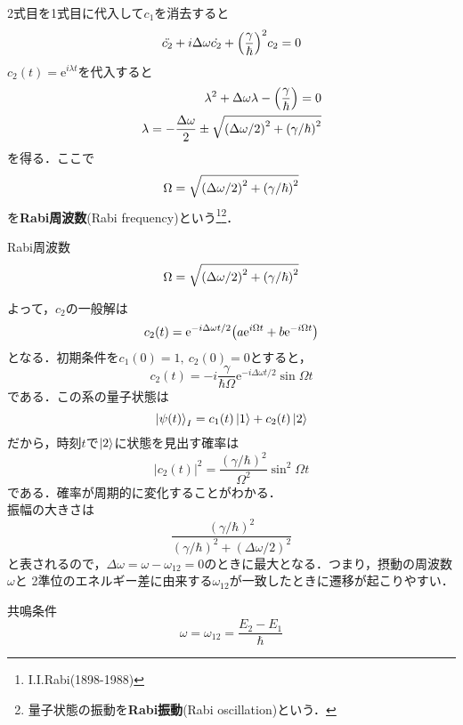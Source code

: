 \documentclass{report}
\begin{document}
  2式目を1式目に代入して$c_1$を消去すると
  \begin{equation}
    \ddot{c_2}+i\Delta\omega\dot{c_2}+\qty(\frac{\gamma}{\hbar})^2c_2=0
  \end{equation}
  $c_2(t)=\mathrm{e}^{i\lambda t}$を代入すると
  \begin{align}
    \lambda^2+\Delta\omega\lambda-\qty(\frac{\gamma}{\hbar})=0\\
    \lambda=-\frac{\Delta\omega}{2}\pm\sqrt{\qty(\Delta\omega/2)^2+\qty(\gamma/\hbar)^2}
  \end{align}
  を得る．ここで
  \begin{equation}
    \Omega=\sqrt{\qty(\Delta\omega/2)^2+\qty(\gamma/\hbar)^2}
  \end{equation}
  を\textbf{Rabi周波数}(Rabi frequency)という\footnote{I.I.Rabi(1898-1988)}\footnote{量子状態の振動を\textbf{Rabi振動}(Rabi oscillation)という．}．
  \begin{itembox}[l]{Rabi周波数}
    \begin{equation}
    \Omega=\sqrt{\qty(\Delta\omega/2)^2+\qty(\gamma/\hbar)^2}   
    \end{equation}
  \end{itembox}
  よって，$c_2$の一般解は
  \begin{equation}
    c_2(t)=\mathrm{e}^{-i\Delta\omega t/2}\qty(a\mathrm{e}^{i\Omega t}+b\mathrm{e}^{-i\Omega t})
  \end{equation}
  となる．初期条件を$c_1(0)=1,\ c_2(0)=0$とすると，
  \begin{equation}
    c_2(t)=-i\frac{\gamma}{\hbar\Omega}\mathrm{e}^{-i\Delta\omega t/2}\sin\Omega t
  \end{equation}
  である．この系の量子状態は
  \begin{equation}
    \ket{\psi(t)}_I=c_1(t)\ket{1}+c_2(t)\ket{2}
  \end{equation}
  だから，時刻$t$で$\ket{2}$に状態を見出す確率は
  \begin{equation}
    |c_2(t)|^2=\frac{(\gamma/\hbar)^2}{\Omega^2}\sin^2\Omega t
  \end{equation}
  である．確率が周期的に変化することがわかる．\\
  振幅の大きさは
  \begin{equation}
    \frac{(\gamma/\hbar)^2}{(\gamma/\hbar)^2+(\Delta\omega/2)^2}
  \end{equation}
  と表されるので，$\Delta\omega=\omega-\omega_{12}=0$のときに最大となる．つまり，摂動の周波数$\omega$と
  2準位のエネルギー差に由来する$\omega_{12}$が一致したときに遷移が起こりやすい．
  \begin{itembox}[l]{共鳴条件}
    \begin{equation}
      \omega=\omega_{12}=\frac{E_2-E_1}{\hbar}
    \end{equation}  
  \end{itembox}
\end{document}
